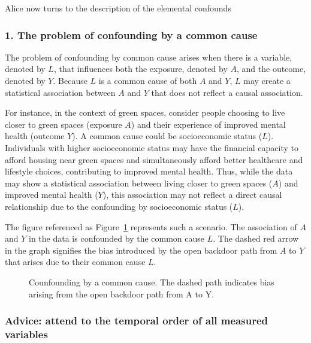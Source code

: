 \documentclass[
  singlecolumn]{article}
\begin{document}
Alice now turns to the description of the elemental confounds

\subsubsection{1. The problem of confounding by a common
cause}\label{the-problem-of-confounding-by-a-common-cause}

The problem of confounding by common cause arises when there is a
variable, denoted by \(L\), that influences both the exposure, denoted
by \(A\), and the outcome, denoted by \(Y.\) Because \(L\) is a common
cause of both \(A\) and \(Y\), \(L\) may create a statistical
association between \(A\) and \(Y\) that does not reflect a causal
association.

For instance, in the context of green spaces, consider people choosing
to live closer to green spaces (exposure \(A\)) and their experience of
improved mental health (outcome \(Y\)). A common cause could be
socioeconomic status (\(L\)). Individuals with higher socioeconomic
status may have the financial capacity to afford housing near green
spaces and simultaneously afford better healthcare and lifestyle
choices, contributing to improved mental health. Thus, while the data
may show a statistical association between living closer to green spaces
(\(A\)) and improved mental health (\(Y\)), this association may not
reflect a direct causal relationship due to the confounding by
socioeconomic status (\(L\)).

The figure referenced as Figure~\ref{fig-dag-common-cause} represents
such a scenario. The association of \(A\) and \(Y\) in the data is
confounded by the common cause \(L\). The dashed red arrow in the graph
signifies the bias introduced by the open backdoor path from \(A\) to
\(Y\) that arises due to their common cause \(L\).

\begin{figure}


\caption{\label{fig-dag-common-cause}Counfounding by a common cause. The
dashed path indicates bias arising from the open backdoor path from A to
Y.}

\end{figure}%

\subsubsection{Advice: attend to the temporal order of all measured
variables}\label{advice-attend-to-the-temporal-order-of-all-measured-variables}
\end{document}
